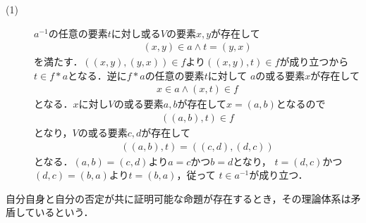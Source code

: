 	\begin{prf}\mbox{}
		\begin{description}
			\item[(1)] $a^{-1}$の任意の要素$t$に対し或る$V$の要素$x,y$が存在して
				\begin{align}
					(x,y) \in a \wedge t = (y,x)
				\end{align}
				を満たす．$((x,y),(y,x)) \in f$より$((x,y),t) \in f$が成り立つから
				$t \in f \ast a$となる．逆に$f \ast a$の任意の要素$t$に対して
				$a$の或る要素$x$が存在して
				\begin{align}
					x \in a \wedge (x,t) \in f
				\end{align}
				となる．$x$に対し$V$の或る要素$a,b$が存在して$x=(a,b)$となるので
				\begin{align}
					((a,b),t) \in f
				\end{align}
				となり，$V$の或る要素$c,d$が存在して
				\begin{align}
					((a,b),t) = ((c,d),(d,c))
				\end{align}
				となる．$(a,b) = (c,d)$より$a=c$かつ$b=d$となり，
				$t = (d,c)$かつ$(d,c)=(b,a)$より$t=(b,a)$，従って
				$t \in a^{-1}$が成り立つ．
		\end{description}
	\end{prf}
	
	
	自分自身と自分の否定が共に証明可能な命題が存在するとき，その理論体系は矛盾しているという．